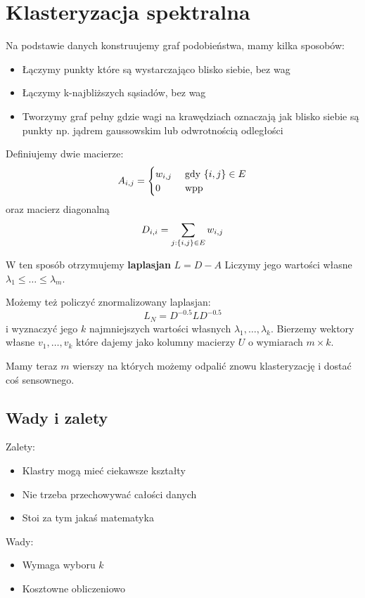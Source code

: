 \section{Klasteryzacja spektralna}

Na podstawie danych konstruujemy graf podobieństwa, mamy kilka sposobów:
\begin{itemize}
	\item Łączymy punkty które są wystarczająco blisko siebie, bez wag
	\item Łączymy k-najbliższych sąsiadów, bez wag
	\item Tworzymy graf pełny gdzie wagi na krawędziach oznaczają jak blisko siebie są punkty np. jądrem gaussowskim lub odwrotnością odległości
\end{itemize}

Definiujemy dwie macierze:
\[
	A_{i, j} = \begin{cases}
		w_{i, j} & \text{ gdy } \set{i, j} \in E \\
		0        & \text{ wpp }
	\end{cases}
\]
oraz macierz diagonalną
\[
	D_{i, i} = \sum_{j : \set{i, j} \in E} w_{i, j}
\]

W ten sposób otrzymujemy \textbf{laplasjan} \( L = D - A \)
Liczymy jego wartości własne \( \lambda_1 \leq \dots \leq \lambda_m \).

Możemy też policzyć znormalizowany laplasjan:
\[
	L_N = D^{-0.5}LD^{-0.5}
\]
i wyznaczyć jego \( k \) najmniejszych wartości własnych \( \lambda_1, \dots, \lambda_k \).
Bierzemy wektory własne \( v_1, \dots, v_k \) które dajemy jako kolumny macierzy \( U \) o wymiarach \( m \times k \).

Mamy teraz \( m \) wierszy na których możemy odpalić znowu klasteryzację i dostać coś sensownego.

\subsection{Wady i zalety}
Zalety:
\begin{itemize}
	\item Klastry mogą mieć ciekawsze kształty
	\item Nie trzeba przechowywać całości danych
	\item Stoi za tym jakaś matematyka
\end{itemize}

Wady:
\begin{itemize}
	\item Wymaga wyboru \( k \)
	\item Kosztowne obliczeniowo
\end{itemize}